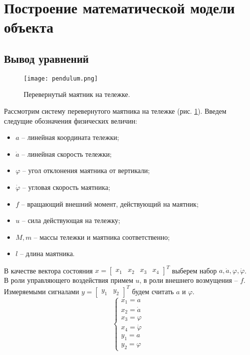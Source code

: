 \tableofcontents

\pagebreak

\section{Построение математической модели объекта}
\subsection{Вывод уравнений}
\begin{figure}[]
    \centering
    \texttt{[image: pendulum.png]}
    \caption{\label{fig:task1_1}Перевернутый маятник на тележке.}
\end{figure}

Рассмотрим систему перевернутого маятника на тележке (рис. \ref{fig:task1_1}). Введем следущие обозначения физических величин:
\begin{itemize}
    \item $a$ -- линейная координата тележки;
    \item $\dot{a}$ -- линейная скорость тележки;
    \item $\varphi$ -- угол отклонения маятника от вертикали;
    \item $\dot{\varphi}$ -- угловая скорость маятника;
    \item $f$ -- вращающий внешний момент, действующий на маятник;
    \item $u$ -- сила действующая на тележку;
    \item $M, m$ --  массы тележки и маятника соответственно;
    \item $l$ -- длина маятника.
\end{itemize}

В качестве вектора состояния $x = \begin{bmatrix}
    x_1 & x_2 & x_3 & x_4
\end{bmatrix}^T$ выберем набор $a, \dot{a}, \varphi, \dot{\varphi}$. В роли управляющего воздействия примем $u$, в роли внешнего возмущения -- $f$.
Измеряемыми сигналами $y = \begin{bmatrix}
    y_1 & y_2
\end{bmatrix}^T$ будем считать $a$ и $\varphi$.
\begin{equation} \label{eq:1}
    \begin{cases}
        x_1 = a \\ x_2 = \dot{a} \\ x_3 = \varphi \\ x_4 = \dot{\varphi} \\ y_1 = a \\ y_2 = \varphi
    \end{cases}
\end{equation}

